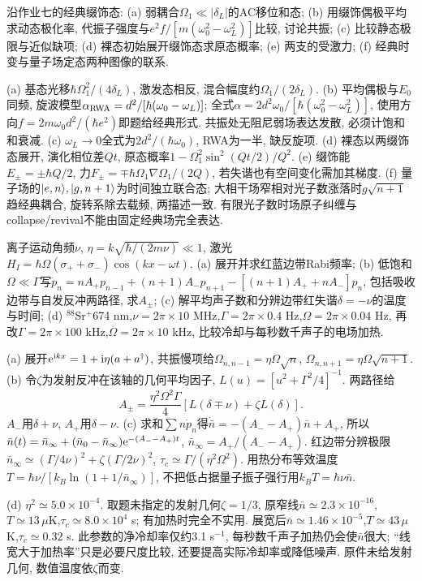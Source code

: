 \begin{exercise}沿作业七的经典缀饰态: (a) 弱耦合$\Omega_1\ll|\delta_L|$的AC移位和态; (b) 用缀饰偶极平均求动态极化率, 代振子强度与$e^2f/[m(\omega_0^2-\omega_L^2)]$比较, 讨论共振; (c) 比较静态极限与近似缺项; (d) 裸态初始展开缀饰态求原态概率; (e) 两支的受激力; (f) 经典时变与量子场定态两种图像的联系.\end{exercise}
\begin{solution}(a) 基态光移$\hbar\Omega_1^2/(4\delta_L)$, 激发态相反, 混合幅度约$\Omega_1/(2\delta_L)$. (b) 平均偶极与$E_0$同频, 旋波模型$\alpha_{\rm RWA}=d^2/[\hbar(\omega_0-\omega_L)]$; 全式$\alpha=2d^2\omega_0/[\hbar(\omega_0^2-\omega_L^2)]$, 使用方向$f=2m\omega_0d^2/(\hbar e^2)$即题给经典形式. 共振处无阻尼弱场表达发散, 必须计饱和和衰减. (c) $\omega_L\to0$全式为$2d^2/(\hbar\omega_0)$, RWA为一半, 缺反旋项. (d) 裸态以两缀饰态展开, 演化相位差$Qt$, 原态概率$1-\Omega_1^2\sin^2(Qt/2)/Q^2$. (e) 缀饰能$E_\pm=\pm\hbar Q/2$, 力$F_\pm=\mp\hbar\Omega_1\nabla\Omega_1/(2Q)$, 若失谐也有空间变化需加其梯度. (f) 量子场的$\lvert e,n\rangle,\lvert g,n+1\rangle$为时间独立联合态; 大相干场窄相对光子数涨落时$g\sqrt{n+1}$趋经典耦合, 旋转系除去载频, 两描述一致. 有限光子数时场原子纠缠与collapse/revival不能由固定经典场完全表达.
\end{solution}
\begin{exercise}离子运动角频$\nu$, $\eta=k\sqrt{\hbar/(2m\nu)}\ll1$, 激光$H_I=\hbar\Omega(\sigma_++\sigma_-)\cos(kx-\omega t)$. (a) 展开并求红蓝边带Rabi频率; (b) 低饱和$\Omega\ll\Gamma$写$\dot p_n=nA_+p_{n-1}+(n+1)A_-p_{n+1}-[(n+1)A_++nA_-]p_n$, 包括吸收边带与自发反冲两路径, 求$A_\pm$; (c) 解平均声子数和分辨边带红失谐$\delta=-\nu$的温度与时间; (d) $^{88}$Sr$^+$674 nm,$\nu=2\pi\times10$ MHz,$\Gamma=2\pi\times0.4$ Hz,$\Omega=2\pi\times0.04$ Hz, 再改$\Gamma=2\pi\times100$ kHz,$\Omega=2\pi\times10$ kHz, 比较冷却与每秒数千声子的电场加热.\end{exercise}
\begin{solution}(a) 展开$\mathrm e^{\mathrm i kx}=1+\mathrm i\eta(a+a^\dagger)$, 共振慢项给$\Omega_{n,n-1}=\eta\Omega\sqrt n$, $\Omega_{n,n+1}=\eta\Omega\sqrt{n+1}$. (b) 令$\zeta$为发射反冲在该轴的几何平均因子, $L(u)=[u^2+\Gamma^2/4]^{-1}$. 两路径给
\[A_\pm=\frac{\eta^2\Omega^2\Gamma}{4}\left[L(\delta\mp\nu)+\zeta L(\delta)\right].\]
$A_-$用$\delta+\nu$, $A_+$用$\delta-\nu$. (c) 求和$\sum n\dot p_n$得$\dot{\bar n}=-(A_--A_+)\bar n+A_+$, 所以$\bar n(t)=\bar n_\infty+(\bar n_0-\bar n_\infty)\mathrm e^{-(A_--A_+)t}$, $\bar n_\infty=A_+/(A_--A_+)$. 红边带分辨极限$\bar n_\infty\simeq(\Gamma/4\nu)^2+\zeta(\Gamma/2\nu)^2$, $\tau_c\simeq\Gamma/(\eta^2\Omega^2)$. 用热分布等效温度$T=\hbar\nu/[k_B\ln(1+1/\bar n_\infty)]$, 不把低占据量子振子强行用$k_BT=\hbar\nu\bar n$.

(d) $\eta^2\simeq5.0\times10^{-4}$. 取题未指定的发射几何$\zeta=1/3$, 原窄线$\bar n\simeq2.3\times10^{-16}$, $T\simeq13\,\mu$K,$\tau_c\simeq8.0\times10^4$ s; 有加热时完全不实用. 展宽后$\bar n\simeq1.46\times10^{-5}$,$T\simeq43\,\mu$K,$\tau_c\simeq0.32$ s. 此参数的净冷却率仅约3.1 s$^{-1}$, 每秒数千声子加热仍会使$\bar n$很大; “线宽大于加热率”只是必要尺度比较, 还要提高实际冷却率或降低噪声. 原件未给发射几何, 数值温度依$\zeta$而变.
\end{solution}
